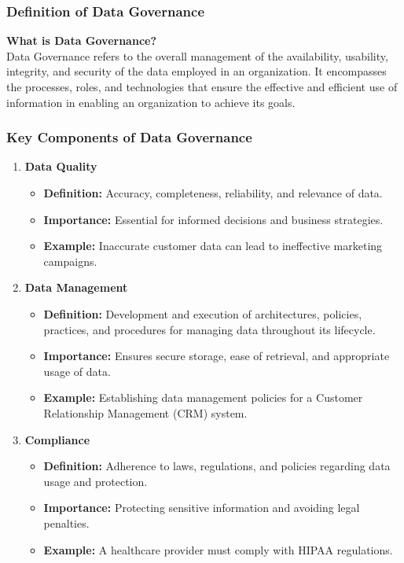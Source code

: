 \documentclass[aspectratio=169]{beamer}
\begin{document}
\begin{frame}[fragile]
    \frametitle{Definition of Data Governance}
    
    \textbf{What is Data Governance?} \\[1.5ex]
    Data Governance refers to the overall management of the availability, usability, integrity, and security of the data employed in an organization. 
    It encompasses the processes, roles, and technologies that ensure the effective and efficient use of information in enabling an organization to achieve its goals.
\end{frame}

\begin{frame}[fragile]
    \frametitle{Key Components of Data Governance}
    
    \begin{enumerate}
        \item \textbf{Data Quality}
        \begin{itemize}
            \item \textbf{Definition:} Accuracy, completeness, reliability, and relevance of data.
            \item \textbf{Importance:} Essential for informed decisions and business strategies.
            \item \textbf{Example:} Inaccurate customer data can lead to ineffective marketing campaigns.
        \end{itemize}
        
        \item \textbf{Data Management}
        \begin{itemize}
            \item \textbf{Definition:} Development and execution of architectures, policies, practices, and procedures for managing data throughout its lifecycle.
            \item \textbf{Importance:} Ensures secure storage, ease of retrieval, and appropriate usage of data.
            \item \textbf{Example:} Establishing data management policies for a Customer Relationship Management (CRM) system.
        \end{itemize}
        
        \item \textbf{Compliance}
        \begin{itemize}
            \item \textbf{Definition:} Adherence to laws, regulations, and policies regarding data usage and protection.
            \item \textbf{Importance:} Protecting sensitive information and avoiding legal penalties.
            \item \textbf{Example:} A healthcare provider must comply with HIPAA regulations.
        \end{itemize}
    \end{enumerate}
\end{frame}
\end{document}

